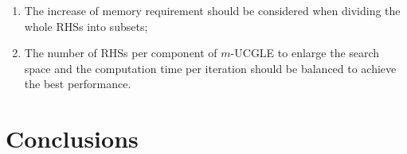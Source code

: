 \begin{enumerate}
	\item The increase of memory requirement should be considered when dividing the whole RHSs into subsets;
	\item The number of RHSs per component of $m$-UCGLE to enlarge the search space and the computation time per iteration should be balanced to achieve the best performance.
\end{enumerate}

\section{Conclusions}

\clearemptydoublepage